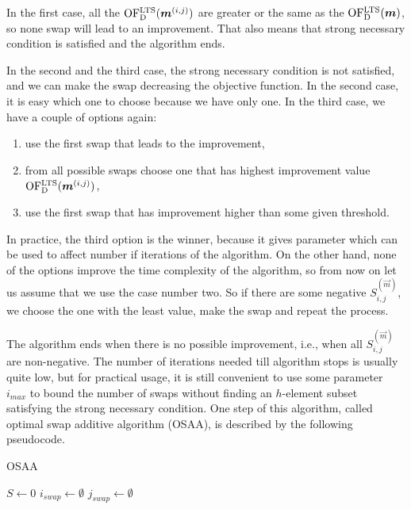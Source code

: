 In the first case, all the $\operatorname{OF^{LTS}_D}(\boldsymbol{m}^{(i,j)})$ are greater or the same as the $\operatorname{OF^{LTS}_D}(\boldsymbol{m})$, so none swap will lead to an improvement. That also means that strong necessary condition is satisfied and the algorithm ends.

In the second and the third case, the strong necessary condition is not satisfied, and we can make the swap decreasing the objective function. In the second case, it is easy which one to choose because we have only one. In the third case, we have a couple of options again:
\begin{enumerate}
    \item use the first swap that leads to the improvement,
    \item from all possible swaps choose one that has highest improvement value  $\operatorname{OF^{LTS}_D}(\boldsymbol{m}^{(i,j)})$,
    \item use the first swap that has improvement higher than some given threshold.
\end{enumerate}

In practice, the third option is the winner, because it gives parameter which can be used to affect number if iterations of the algorithm. On the other hand, none of the options improve the time complexity of the algorithm, so from now on let us assume that we use the case number two.
So if there are some negative  $S^{(\vec{m})}_{i,j}$, we choose the one with the least value, make the swap and repeat the process.  

The algorithm ends when there is no possible improvement, i.e., when all $S^{(\vec{m})}_{i,j}$ are non-negative.
The number of iterations needed till algorithm stops is usually quite low, but for practical usage, it is still convenient to use some parameter $i_{max}$ to bound the number of swaps without finding an $h$-element subset satisfying the strong necessary condition. 
One step of this algorithm, called optimal swap additive algorithm (OSAA), is described by the following pseudocode.

\begin{algorithm}[H]
    \label{alg:optimal:improvement}
    \caption{OSAA}
    
    $S \gets 0$\;
    $i_{swap} \gets \emptyset$\;
    $j_{swap} \gets \emptyset$\;

    \;
\end{algorithm}


